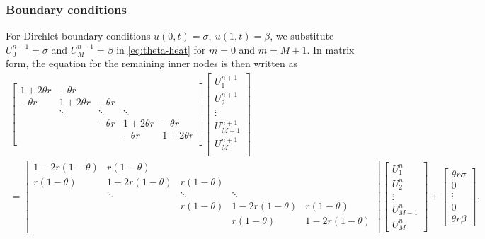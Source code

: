 \subsubsection{Boundary conditions}
For Dirchlet boundary conditions $u(0, t) = \sigma, \: u(1, t) = \beta$, 
we substitute $U_0^{n+1} = \sigma$ and $U_M^{n+1} = \beta$ in \eqref{eq:theta-heat} for $m=0$ and $m=M+1$. 
In matrix form, 
the equation for the remaining inner nodes is then written as
\begin{multline}
    \begin{bmatrix}
    1+2\theta r & -\theta r \\
    -\theta r & 1+2\theta r & -\theta r & \\
      & \ddots & \ddots & \ddots & \\
      &   & -\theta r & 1+2\theta r & -\theta r \\
      &   &  & -\theta r & 1+2\theta r \\
    \end{bmatrix}
    \begin{bmatrix}
    U_{1}^{n+1} \\ U_{2}^{n+1} \\ \vdots \\ U_{M-1}^{n+1} \\ U_{M}^{n+1} \\
    \end{bmatrix}
    \\
    = 
    \begin{bmatrix}
    1-2r(1 - \theta) & r(1-\theta) \\
    r(1-\theta) & 1-2r(1 - \theta) & r(1-\theta) & \\
      & \ddots & \ddots & \ddots & \\
      &   & r(1-\theta) & 1-2r(1 - \theta) & r(1-\theta) \\
      &   &  & r(1-\theta) & 1-2r(1 - \theta) \\
    \end{bmatrix}
    \begin{bmatrix}
    U_{1}^{n} \\ U_{2}^{n} \\ \vdots \\ U_{M-1}^{n} \\ U_{M}^{n}
    \end{bmatrix}
    + 
    \begin{bmatrix}
    \theta r \sigma \\ 0 \\ \vdots \\ 0 \\ \theta r \beta
    \end{bmatrix}
    .
    \label{eq:theta-heat-matrix-dirchlet}
\end{multline}

